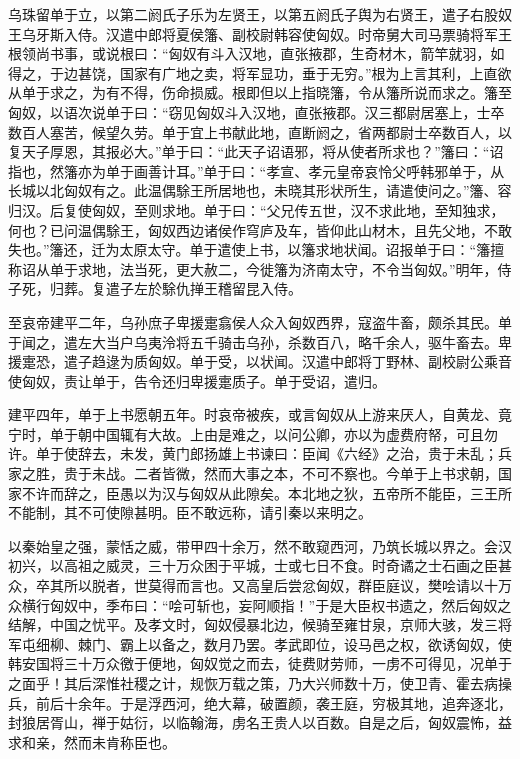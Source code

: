 \documentclass[12pt,UTF8]{ctexbook}
\begin{document}
乌珠留单于立，以第二阏氏子乐为左贤王，以第五阏氏子舆为右贤王，遣子右股奴王乌牙斯入侍。汉遣中郎将夏侯籓、副校尉韩容使匈奴。时帝舅大司马票骑将军王根领尚书事，或说根曰：“匈奴有斗入汉地，直张掖郡，生奇材木，箭竿就羽，如得之，于边甚饶，国家有广地之卖，将军显功，垂于无穷。”根为上言其利，上直欲从单于求之，为有不得，伤命损威。根即但以上指晓籓，令从籓所说而求之。籓至匈奴，以语次说单于曰：“窃见匈奴斗入汉地，直张掖郡。汉三都尉居塞上，士卒数百人塞苦，候望久劳。单于宜上书献此地，直断阏之，省两都尉士卒数百人，以复天子厚恩，其报必大。”单于曰：“此天子诏语邪，将从使者所求也？”籓曰：“诏指也，然籓亦为单于画善计耳。”单于曰：“孝宣、孝元皇帝哀怜父呼韩邪单于，从长城以北匈奴有之。此温偶駼王所居地也，未晓其形状所生，请遣使问之。”籓、容归汉。后复使匈奴，至则求地。单于曰：“父兄传五世，汉不求此地，至知独求，何也？已问温偶駼王，匈奴西边诸侯作穹庐及车，皆仰此山材木，且先父地，不敢失也。”籓还，迁为太原太守。单于遣使上书，以籓求地状闻。诏报单于曰：“籓擅称诏从单于求地，法当死，更大赦二，今徙籓为济南太守，不令当匈奴。”明年，侍子死，归葬。复遣子左於駼仇掸王稽留昆入侍。



至哀帝建平二年，乌孙庶子卑援疐翕侯人众入匈奴西界，寇盗牛畜，颇杀其民。单于闻之，遣左大当户乌夷泠将五千骑击乌孙，杀数百八，略千余人，驱牛畜去。卑援疐恐，遣子趋逯为质匈奴。单于受，以状闻。汉遣中郎将丁野林、副校尉公乘音使匈奴，责让单于，告令还归卑援疐质子。单于受诏，遣归。



建平四年，单于上书愿朝五年。时哀帝被疾，或言匈奴从上游来厌人，自黄龙、竟宁时，单于朝中国辄有大故。上由是难之，以问公卿，亦以为虚费府帑，可且勿许。单于使辞去，未发，黄门郎扬雄上书谏曰：臣闻《六经》之治，贵于未乱；兵家之胜，贵于未战。二者皆微，然而大事之本，不可不察也。今单于上书求朝，国家不许而辞之，臣愚以为汉与匈奴从此隙矣。本北地之狄，五帝所不能臣，三王所不能制，其不可使隙甚明。臣不敢远称，请引秦以来明之。



以秦始皇之强，蒙恬之威，带甲四十余万，然不敢窥西河，乃筑长城以界之。会汉初兴，以高祖之威灵，三十万众困于平城，士或七日不食。时奇谲之士石画之臣甚众，卒其所以脱者，世莫得而言也。又高皇后尝忿匈奴，群臣庭议，樊哙请以十万众横行匈奴中，季布曰：“哙可斩也，妄阿顺指！”于是大臣权书遗之，然后匈奴之结解，中国之忧平。及孝文时，匈奴侵暴北边，候骑至雍甘泉，京师大骇，发三将军屯细柳、棘门、霸上以备之，数月乃罢。孝武即位，设马邑之权，欲诱匈奴，使韩安国将三十万众徼于便地，匈奴觉之而去，徒费财劳师，一虏不可得见，况单于之面乎！其后深惟社稷之计，规恢万载之策，乃大兴师数十万，使卫青、霍去病操兵，前后十余年。于是浮西河，绝大幕，破置颜，袭王庭，穷极其地，追奔逐北，封狼居胥山，禅于姑衍，以临翰海，虏名王贵人以百数。自是之后，匈奴震怖，益求和亲，然而未肯称臣也。
\end{document}
